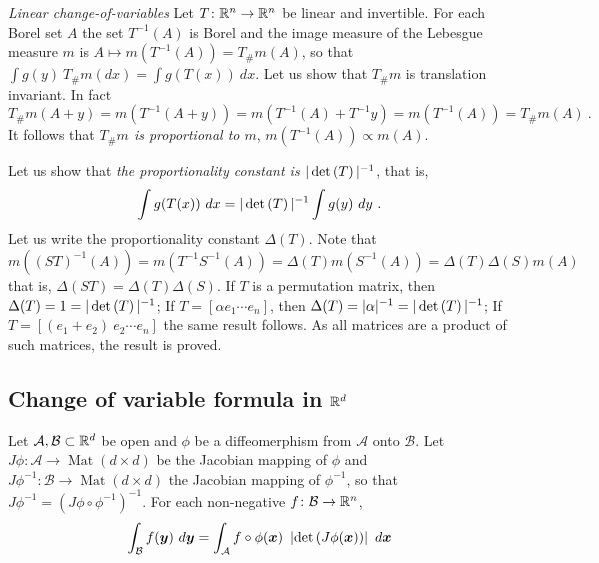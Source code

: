 \documentclass[12pt,a4paper]{amsart}
\newcommand{\Mof}[1]{\operatorname{Mat}\left(#1\times#1\right)}
\newcommand{\by}{\bm y}
\theoremstyle{plain}%
\theoremstyle{definition}
\theoremstyle{remark}
\begin{document}
\emph{Linear change-of-variables}
Let $T \colon \mathbb{R}^n \to \mathbb{R}^n$ be linear and invertible. For each Borel set $A$ the set $T^{-1}(A)$ is Borel and the image measure of the Lebesgue measure $m$ is $A \mapsto m(T^{-1}(A)) = T_{\#} m (A)$, so that $\int g(y) \ T_{\#}m(dx) = \int g(T(x)) \ dx$. Let us show that $T_{\#}m$ is translation invariant. In fact
\begin{equation*}
T_{\#}m(A + y) = m(T^{-1}(A + y)) = m(T^{-1}(A) + T^{-1}y) = m(T^{-1}(A)) = T_{\#}m(A) \ .
\end{equation*}
It follows that \emph{$T_{\#}m$ is proportional to $m$}, $m(T^{-1}(A)) \propto m(A)$.

Let us show that \emph{the proportionality constant is $|\operatorname{det}\left(T\right)|^{-1}$}, that is,
\begin{equation*}
\int g(T(x)) \ dx = |\detof{T}|^{-1} \int g(y) \ dy \ .
\end{equation*}
Let us write the proportionality constant $\Delta(T)$. Note that $m((ST)^{-1}(A)) = m(T^{-1}S^{-1}(A)) = \Delta(T)m(S^{-1}(A)) = \Delta(T)\Delta(S)m(A)$ that is, $\Delta(ST) = \Delta(T)\Delta(S)$. If $T$ is a permutation matrix, then $\Delta(T) = 1 = |\operatorname{det}\left(T\right)|^{-1}$; If $T = [\alpha e_1 \cdots e_n]$, then $\Delta(T) = |\alpha|^{-1} = |\operatorname{det}\left(T\right)|^{-1}$; If $T = [(e_1+e_2) \ e_2 \cdots e_n]$ the same result follows. As all matrices are a product of such matrices, the result is proved.

\subsection{Change of variable formula in $\mathbb{R}^d$} Let $\mathcal A, \mathcal B \subset \mathbb{R}^d$ be open and $\phi$ be a diffeomerphism from $\mathcal A$ onto $\mathcal B$. Let $J\phi \colon \mathcal A \to \Mof d$ be the Jacobian mapping of $\phi$ and $J\phi^{-1} \colon \mathcal B \to \Mof d$ the Jacobian mapping of $\phi^{-1}$, so that $J\phi^{-1} = \left(J\phi\circ \phi^{-1}\right)^{-1}$. For each non-negative $f \colon \mathcal B \to \mathbb{R}^n$,
  \begin{equation*}\label{eq:change}
    \int_{\mathcal B} f(\by) \ d\by = \int_{\mathcal A} f\circ\phi(\bx) \ \absoluteval{\detof{J\phi(\bx)}} \ d\bx
  \end{equation*}
\end{document}
